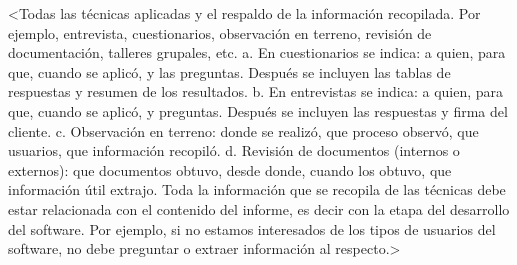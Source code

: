 <Todas las técnicas aplicadas y el respaldo de la información recopilada. Por ejemplo, entrevista, cuestionarios, observación en terreno, revisión de documentación, talleres grupales, etc.
a.	En cuestionarios se indica: a quien, para que, cuando se aplicó, y las preguntas. Después se incluyen las tablas de respuestas y resumen de los resultados.
b.	En entrevistas se indica: a quien, para que, cuando se aplicó, y preguntas. Después se incluyen las respuestas y firma del cliente.
c.	Observación en terreno: donde se realizó, que proceso observó, que usuarios, que información recopiló.
d.	Revisión de documentos (internos o externos): que documentos obtuvo, desde donde, cuando los obtuvo, que información útil extrajo.
Toda la información que se recopila de las técnicas debe estar relacionada con el contenido del informe, es decir con la etapa del desarrollo del software. Por ejemplo, si no estamos interesados de los tipos de usuarios del software, no debe preguntar o extraer información al respecto.>